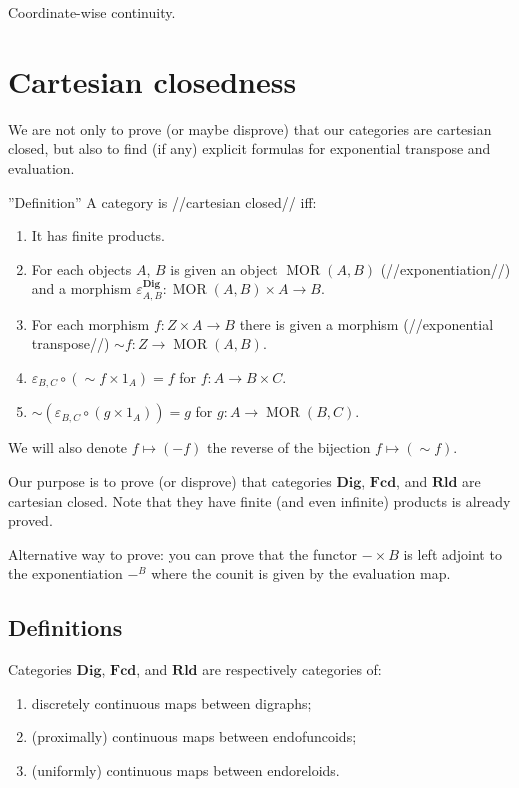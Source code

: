 Coordinate-wise continuity.

\section{Cartesian closedness}

We are not only to prove (or maybe disprove) that our categories are cartesian closed, but also to find (if any) explicit formulas for exponential transpose and evaluation.

''Definition'' A category is //cartesian closed// iff:
\begin{enumerate}
\item It has finite products.
\item For each objects $A$, $B$ is given an object $\operatorname{MOR} ( A , B)$ (//exponentiation//) and a morphism $\varepsilon^{\mathbf{Dig}}_{A, B} : \operatorname{MOR} ( A , B) \times A \rightarrow B$.
\item For each morphism $f : Z \times A \rightarrow B$ there is given a morphism (//exponential transpose//) $\sim f : Z \rightarrow \operatorname{MOR} ( A , B)$.
\item $\varepsilon_{B,C} \circ ( \sim f \times 1_A) = f$ for $f : A \rightarrow B \times C$.
\item $\sim ( \varepsilon_{B,C} \circ ( g \times 1_A)) = g$ for $g : A \rightarrow \operatorname{MOR} ( B , C)$.
\end{enumerate}

We will also denote $f\mapsto (-f)$ the reverse of the bijection $f\mapsto (\sim f)$.

Our purpose is to prove (or disprove) that categories $\mathbf{Dig}$, $\mathbf{Fcd}$, and $\mathbf{Rld}$ are cartesian closed. Note that they have finite (and even infinite) products is already proved.

Alternative way to prove:
you can prove that the functor $-\times B$ is left adjoint to the exponentiation $-^B$ where the counit is given by the evaluation map.

\subsection{Definitions}

Categories $\mathbf{Dig}$, $\mathbf{Fcd}$, and $\mathbf{Rld}$ are respectively categories of:
\begin{enumerate}
\item discretely continuous maps between digraphs;
\item (proximally) continuous maps between endofuncoids;
\item (uniformly) continuous maps between endoreloids.
\end{enumerate}

